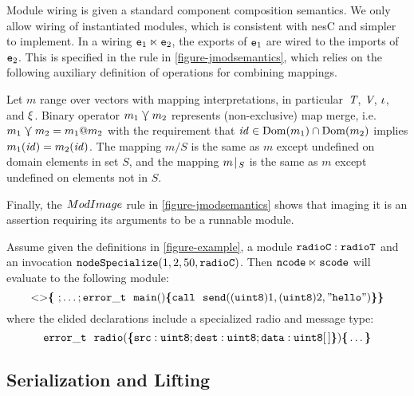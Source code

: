 Module wiring is given a standard component composition semantics. We
only allow wiring of instantiated modules, which is consistent with
nesC and simpler to implement. In a wiring
$\jwire{\tt{e}_1}{\tt{e}_2}$, the exports of $\tt{e}_1$ are wired to
the imports of $\tt{e}_2$.  This is specified in the 
rule in \autoref{figure-jmodsemantics}, which relies on the following
auxiliary definition of operations for combining mappings.
\begin{definition}
Let $m$ range over vectors with mapping interpretations, in
particular~$\tpdecl$, $\vpdecl$, $\imports$, and $\exports$. Binary
operator $m_1\maploosemerge m_2$ represents (non-exclusive) map merge,
i.e.~$m_1 \maploosemerge m_2 = m_1 @ m_2$ with the requirement that
$\identifier\in \dom(m_1)\cap\dom(m_2)$ implies $m_1(\identifier) =
m_2(\identifier)$.
The mapping $m / S$ is the same as $m$ except undefined on domain
elements in set $S$, and the mapping $\restrict{m}{S}$ is the same
as $m$ except undefined on elements not in ${S}$.
\end{definition}
Finally, the $\TirName{ModImage}$ rule in
\autoref{figure-jmodsemantics} shows that imaging it is an
assertion requiring its arguments to be a runnable module.

\begin{example}
\label{example-scalanesssemantics}
Assume given the definitions in \autoref{figure-example}, a module
$\tt{radioC : radioT}$ and an invocation 
$\tt{nodeSpecialize}(1,2,50,\tt{radioC})$. 
Then $\tt{ncode} \ltimes \tt{scode}$ will evaluate to the following module:
$$
\margs{}\lc\ ; \ldots; \tt{error\_t\ \ main()} \lc \tt{call}\ \ \tt{send}((\tt{uint8})1, (\tt{uint8})2, "\tt{hello}") \rc\rc
$$  
where the elided declarations include a specialized radio and message type:
$$
\tt{error\_t\ \ radio(\lc \tt{src : uint8}; \tt{dest : uint8}; \tt{data : uint8[\,]} \rc)} \lc \ldots \rc
$$
\end{example}

\subsection{Serialization and Lifting}
\label{section-serialization}

